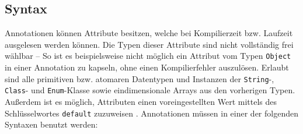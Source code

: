 \subsection{Syntax}
\label{java_annotationen_syntax}
\noindent Annotationen können Attribute besitzen, welche bei Kompilierzeit bzw. Laufzeit ausgelesen werden können. Die Typen dieser Attribute sind nicht vollständig frei wählbar -- So ist es beispielsweise nicht möglich ein Attribut vom Typen \texttt{Object} in einer Annotation zu kapseln, ohne einen Kompilierfehler auszulösen. Erlaubt sind alle primitiven bzw. atomaren Datentypen und Instanzen der \texttt{String}-, \texttt{Class}- und \texttt{Enum}-Klasse sowie eindimensionale Arrays aus den vorherigen Typen. Außerdem ist es möglich, Attributen einen voreingestellten Wert mittels des Schlüsselwortes \texttt{default} zuzuweisen \cite{Gosling2005}. Annotationen müssen in einer der folgenden Syntaxen benutzt werden:
